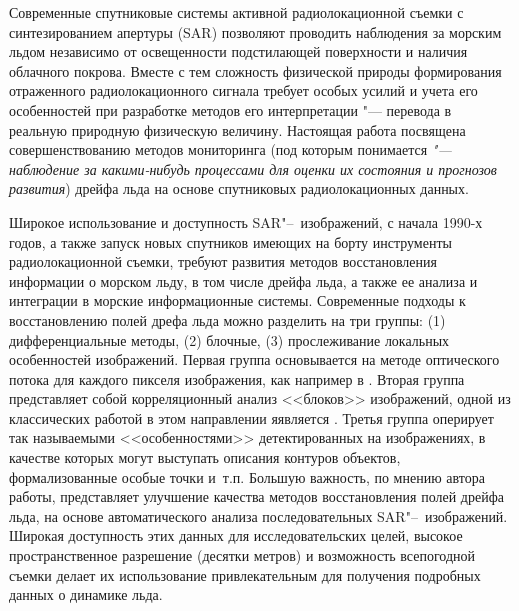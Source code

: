 Современные спутниковые системы активной радиолокационной съемки с синтезированием апертуры (SAR)  \cite{sar} позволяют проводить наблюдения за морским льдом независимо от освещенности подстилающей поверхности и наличия облачного покрова. Вместе с тем сложность физической природы формирования отраженного радиолокационного сигнала требует особых усилий и учета его особенностей при разработке методов его интерпретации "--- перевода в реальную природную физическую величину. Настоящая работа посвящена совершенствованию методов мониторинга (под которым понимается \textit{"--- наблюдение за какими-нибудь процессами для оценки их состояния и прогнозов развития}) дрейфа льда на основе спутниковых радиолокационных данных.

Широкое использование и доступность SAR"--~изображений, с начала 1990-х годов, а также запуск новых спутников имеющих на борту инструменты радиолокационной съемки, требуют развития методов восстановления информации о морском льду, в том числе дрейфа льда, а также ее анализа и интеграции в морские информационные системы. Современные подходы к восстановлению полей дрефа льда можно разделить на три группы: (1) дифференциальные методы, (2) блочные, (3) прослеживание локальных особенностей изображений. Первая группа основывается на методе оптического потока для каждого пикселя изображения, как например в \cite{sun1996automatic}. Вторая группа представляет собой корреляционный анализ <<блоков>> изображений, одной из классических работой в этом направлении яявляется \cite{fily1986extracting}. Третья группа оперирует так называемыми <<особенностями>> детектированных на изображениях, в качестве которых могут выступать описания контуров объектов, формализованные особые точки и~т.\:п. \cite{daida1990object,mcconnell1991psi} 
Большую важность, по мнению автора работы, представляет улучшение качества методов восстановления полей дрейфа льда, на основе автоматического анализа последовательных SAR"--~изображений. Широкая доступность этих данных для исследовательских целей, высокое пространственное разрешение (десятки метров) и возможность всепогодной съемки делает их использование привлекательным для получения подробных данных о динамике льда.




